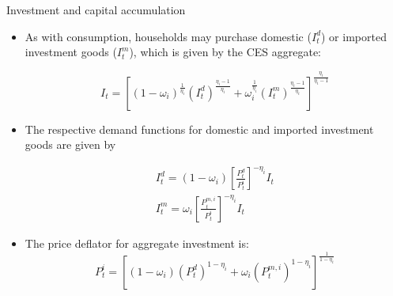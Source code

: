 \documentclass[9pt]{beamer}
\begin{document}
\begin{frame}{Investment and capital accumulation}
\begin{itemize}
    
    \item  As with consumption, households may purchase domestic ($I_t^{d}$) or imported investment goods ($I_t^{m}$), which is given by the CES aggregate:

$$I_{t}=\left[\left(1-\omega_{i}\right)^{\frac{1}{\eta_{i}}}\left(I_{t}^{d}\right)^{\frac{\eta_{i}-1}{\eta_{i}}}+\omega_{i}^{\frac{1}{\eta_{i}}}\left(I_{t}^{m}\right)^{\frac{\eta_{i}-1}{\eta_{i}}}\right]^{\frac{\eta_{i}}{\eta_{i}-1}}$$

    \item The respective demand functions for domestic and imported
    investment goods are given by
    
$$
\begin{aligned}I_{t}^{d}=\left(1-\omega_{i}\right)\left[\frac{P_{t}^{d}}{P_{t}^{i}}\right]^{-\eta_{i}} I_{t} \\ I_{t}^{m}=\omega_{i}\left[\frac{P_{t}^{m, i}}{P_{t}^{i}}\right]^{-\eta_{i}} I_{t}
\end{aligned}$$

  \item The price deflator for aggregate investment is:
    $$P_{t}^{i}=\left[\left(1-\omega_{i}\right)\left(P_{t}^{d}\right)^{1-\eta_{i}}+\omega_{i}\left(P_{t}^{m, i}\right)^{1-\eta_{i}}\right]^{\frac{1}{1-\eta_{i}}}$$
    
    
\end{itemize}

\end{frame}
\end{document}

